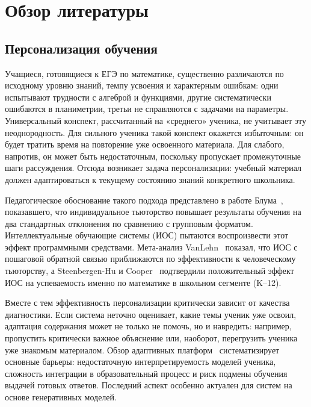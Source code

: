 \section{Обзор литературы} 
\subsection{Персонализация обучения}
\label{sec:personalization}

Учащиеся, готовящиеся к ЕГЭ по математике, существенно различаются по исходному уровню знаний, темпу усвоения и характерным ошибкам: одни испытывают трудности с алгеброй и функциями, другие систематически ошибаются в планиметрии, третьи не справляются с задачами на параметры. Универсальный конспект, рассчитанный на «среднего» ученика, не учитывает эту неоднородность. Для сильного ученика такой конспект окажется избыточным: он будет тратить время на повторение уже освоенного материала. Для слабого, напротив, он может быть недостаточным, поскольку пропускает промежуточные шаги рассуждения. Отсюда возникает задача персонализации: учебный материал должен адаптироваться к текущему состоянию знаний конкретного школьника.

Педагогическое обоснование такого подхода представлено в работе Блума~\cite{Bloom1984}, показавшего, что индивидуальное тьюторство повышает результаты обучения на два стандартных отклонения по сравнению с групповым форматом. Интеллектуальные обучающие системы (ИОС) пытаются воспроизвести этот эффект программными средствами. Мета-анализ VanLehn~\cite{VanLehn2011} показал, что ИОС с пошаговой обратной связью приближаются по эффективности к человеческому тьюторству, а Steenbergen-Hu и Cooper~\cite{SteenbergenHu2013} подтвердили положительный эффект ИОС на успеваемость именно по математике в школьном сегменте (K--12).

Вместе с тем эффективность персонализации критически зависит от качества диагностики. Если система неточно оценивает, какие темы ученик уже освоил, адаптация содержания может не только не помочь, но и навредить: например, пропустить критически важное объяснение или, наоборот, перегрузить ученика уже знакомым материалом. Обзор адаптивных платформ~\cite{Tan2025} систематизирует основные барьеры: недостаточную интерпретируемость моделей ученика, сложность интеграции в образовательный процесс и риск подмены обучения выдачей готовых ответов. Последний аспект особенно актуален для систем на основе генеративных моделей.

